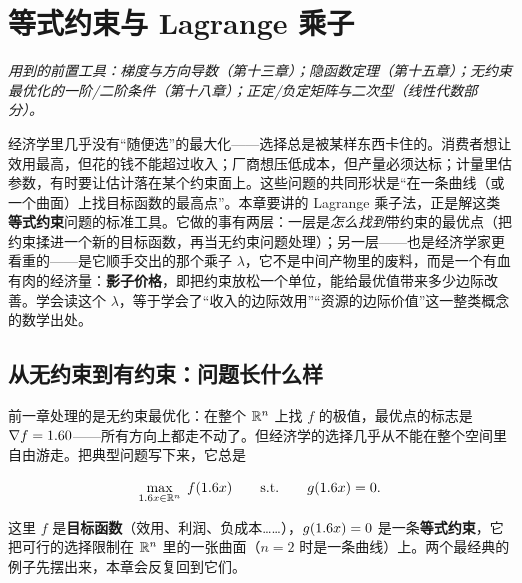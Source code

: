 \chapter{等式约束与 Lagrange 乘子}
\label{ch:lagrange}

\noindent\emph{用到的前置工具：梯度与方向导数（第十三章）；隐函数定理（第十五章）；无约束最优化的一阶/二阶条件（第十八章）；正定/负定矩阵与二次型（线性代数部分）。}
\medskip

经济学里几乎没有``随便选''的最大化——选择总是被某样东西卡住的。消费者想让效用最高，但花的钱不能超过收入；厂商想压低成本，但产量必须达标；计量里估参数，有时要让估计落在某个约束面上。这些问题的共同形状是``在一条曲线（或一个曲面）上找目标函数的最高点''。本章要讲的 Lagrange 乘子法，正是解这类\textbf{等式约束}问题的标准工具。它做的事有两层：一层是\emph{怎么找到}带约束的最优点（把约束揉进一个新的目标函数，再当无约束问题处理）；另一层——也是经济学家更看重的——是它顺手交出的那个乘子 $\lambda$，它不是中间产物里的废料，而是一个有血有肉的经济量：\textbf{影子价格}，即把约束放松一个单位，能给最优值带来多少边际改善。学会读这个 $\lambda$，等于学会了``收入的边际效用''``资源的边际价值''这一整类概念的数学出处。

\section{从无约束到有约束：问题长什么样}
\label{sec:lagrange-1}

前一章处理的是无约束最优化：在整个 $\mathbb{R}^n$ 上找 $f$ 的极值，最优点的标志是 $\nabla f=1.6 0$——所有方向上都走不动了。但经济学的选择几乎从不能在整个空间里自由游走。把典型问题写下来，它总是

\[
    \max_{1.6 x\in\mathbb{R}^n}\; f(1.6 x)
    \qquad \text{s.t.}\qquad
    g(1.6 x)=0 .
\]

这里 $f$ 是\textbf{目标函数}（效用、利润、负成本……），$g(1.6 x)=0$ 是一条\textbf{等式约束}，它把可行的选择限制在 $\mathbb{R}^n$ 里的一张曲面（$n=2$ 时是一条曲线）上。两个最经典的例子先摆出来，本章会反复回到它们。



